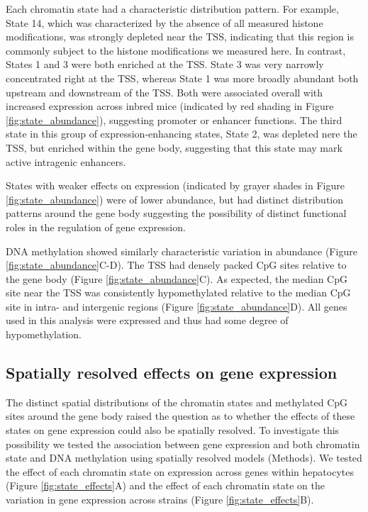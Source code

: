 \documentclass[
  11pt,
]{article}
\begin{document}
Each chromatin state had a characteristic distribution pattern. For
example, State 14, which was characterized by the absence of all
measured histone modifications, was strongly depleted near the TSS,
indicating that this region is commonly subject to the histone
modifications we measured here. In contrast, States 1 and 3 were both
enriched at the TSS. State 3 was very narrowly concentrated right at the
TSS, whereas State 1 was more broadly abundant both upstream and
downstream of the TSS. Both were associated overall with increased
expression across inbred mice (indicated by red shading in Figure
\ref{fig:state_abundance}), suggesting promoter or enhancer functions.
The third state in this group of expression-enhancing states, State 2,
was depleted nere the TSS, but enriched within the gene body, suggesting
that this state may mark active intragenic enhancers.

States with weaker effects on expression (indicated by grayer shades in
Figure \ref{fig:state_abundance}) were of lower abundance, but had
distinct distribution patterns around the gene body suggesting the
possibility of distinct functional roles in the regulation of gene
expression.

DNA methylation showed similarly characteristic variation in abundance
(Figure \ref{fig:state_abundance}C-D). The TSS had densely packed CpG
sites relative to the gene body (Figure \ref{fig:state_abundance}C). As
expected, the median CpG site near the TSS was consistently
hypomethylated relative to the median CpG site in intra- and intergenic
regions (Figure \ref{fig:state_abundance}D). All genes used in this
analysis were expressed and thus had some degree of hypomethylation.

\hypertarget{spatially-resolved-effects-on-gene-expression}{%
\subsection{Spatially resolved effects on gene
expression}\label{spatially-resolved-effects-on-gene-expression}}

The distinct spatial distributions of the chromatin states and
methylated CpG sites around the gene body raised the question as to
whether the effects of these states on gene expression could also be
spatially resolved. To investigate this possibility we tested the
association between gene expression and both chromatin state and DNA
methylation using spatially resolved models (Methods). We tested the
effect of each chromatin state on expression across genes within
hepatocytes (Figure \ref{fig:state_effects}A) and the effect of each
chromatin state on the variation in gene expression across strains
(Figure \ref{fig:state_effects}B).
\end{document}
